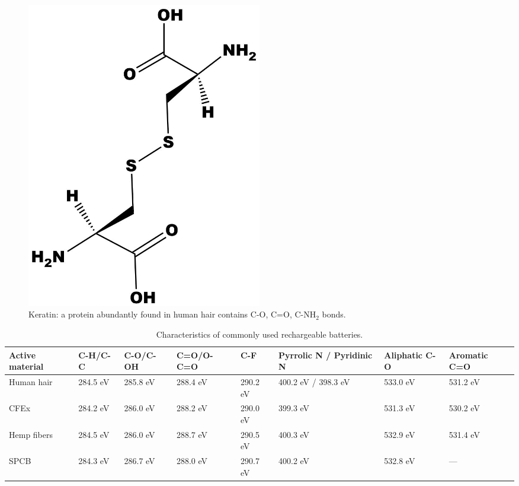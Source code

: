 \begin{figure}[th!]
\centering
\includegraphics[width=0.5\textwidth]{Figures/chap5fig/keratin}
\caption{Keratin: a protein abundantly found in human hair contains C-O, C=O, C-NH$_2$ bonds.}
\label{Figures/chap5fig:keratin}
\end{figure}

\begin{table}
\centering
\caption{Characteristics of commonly used rechargeable batteries.} \label{table2xps}
\begin{tabular}{ |p{2.5cm}|p{2cm}|p{2cm}|p{2cm}|p{1.5cm}|p{2.5cm}|p{2.5cm}|p{2.5cm}|}
\hline
\textbf{Active material} & \textbf{C-H/C-C} & \textbf{C-O/C-OH} & \textbf{C=O/O-C=O} & \textbf{C-F} & \textbf{Pyrrolic N / Pyridinic N} & \textbf{Aliphatic C-O} & \textbf{Aromatic C=O}\\
\hline
Human hair & 284.5 eV & 285.8 eV & 288.4 eV & 290.2 eV & 400.2 eV / 398.3 eV & 533.0 eV & 531.2 eV\\
CFEx & 284.2 eV & 286.0 eV & 288.2 eV & 290.0 eV & 399.3 eV & 531.3 eV & 530.2 eV\\
Hemp fibers & 284.5 eV & 286.0 eV & 288.7 eV & 290.5 eV & 400.3 eV & 532.9 eV & 531.4 eV\\
SPCB & 284.3 eV & 286.7 eV & 288.0 eV & 290.7 eV & 400.2 eV & 532.8 eV & ---\\
\hline
\end{tabular}
\end{table}

\newpage

